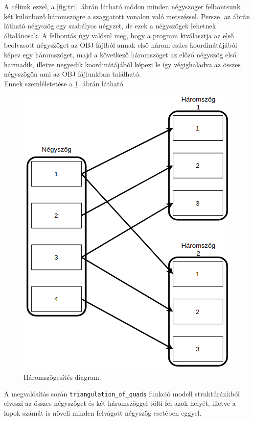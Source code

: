 A célünk ezzel, a \ref{fig:tri}. ábrán  látható módon minden négyszöget felbontsunk két különböző háromszögre a szaggatott vonalon való metszéssel. Persze, az ábrán látható négyszög egy szabályos négyzet, de ezek a négyszögek lehetnek általánosak.
A felbontás úgy valósul meg, hogy a program kiválasztja az első beolvasott négyszöget az OBJ fájlból annak első három csúcs koordinátájából képez egy háromszöget, majd a következő háromszöget az előző négyszög első harmadik, illetve negyedik koordinátájából képezi le így végighaladva az összes négyszögön ami az OBJ fájlunkban található.\\Ennek szemléletetése a \ref{fig:tri1}. ábrán látható.

\begin{figure}[h]
\centering
\includegraphics[scale=0.39]{images/haromszog.png}
\caption{Háromszögesítés diagram.}
\label{fig:tri1}
\end{figure}

A megvalósítás során \texttt{triangulation\_of\_quads} funkció modell struktúránkból elveszi az összes négyszöget és két háromszöggel tölti fel azok helyét, illetve a lapok számát is növeli minden felvágott négyszög esetében eggyel.

